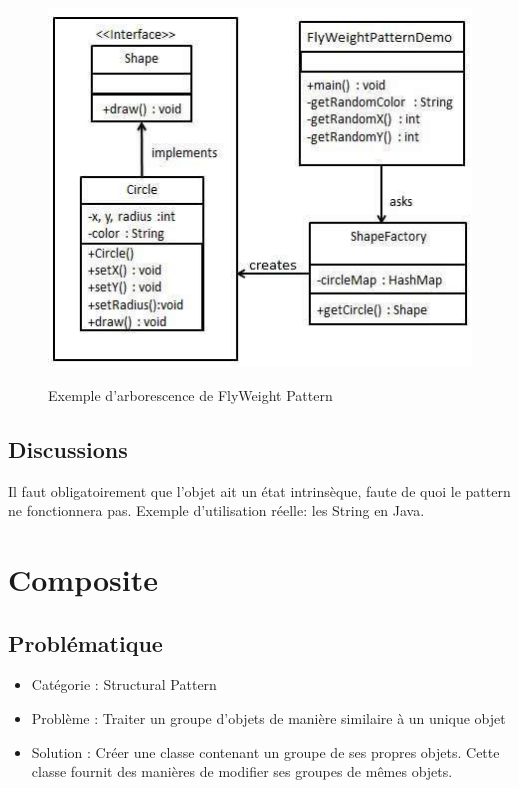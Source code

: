 \begin{figure}[!ht]
	\centering
	\begin{minipage}[t]{8.0cm}
		\includegraphics[scale=0.5]{Images/fly.jpg}
		\label{s1}
   		\caption{Exemple d'arborescence de FlyWeight Pattern}
	\end{minipage}
	
\end{figure}


\subsection{Discussions}
Il faut obligatoirement que l'objet ait un état intrinsèque, faute de quoi le pattern ne fonctionnera pas.
Exemple d'utilisation réelle: les String en Java.










\section{Composite}
\subsection{Problématique}
\begin{itemize}
    \item Catégorie : Structural Pattern
    \item Problème : Traiter un groupe d’objets de manière similaire à un unique objet
    \item Solution : Créer une classe contenant un groupe de ses propres objets. Cette classe fournit des manières de modifier ses groupes de mêmes objets. 
\end{itemize}
